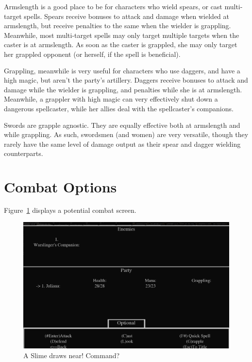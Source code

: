 \documentclass{report}
\begin{document}
\begin{itemize}
\begin{itemize}
Armslength is a good place to be for characters who wield spears, or cast 
multi-target spells. Spears receive bonuses to attack and damage when wielded at
armslength, but receive penalties to the same when the wielder is grappling. 
Meanwhile, most multi-target spells may only target multiple targets when the 
caster is at armslength. As soon as the caster is grappled, she may only target
her grappled opponent (or herself, if the spell is beneficial).

Grappling, meanwhile is very useful for characters who use daggers, and have a 
high magic, but aren't the party's artillery. Daggers receive bonuses to attack
and damage while the wielder is grappling, and penalties while she is at
armslength. Meanwhile, a grappler with high magic can very effectively shut down
a dangerous spellcaster, while her allies deal with the spellcaster's companions.

Swords are grapple agnostic. They are equally effective both at armslength and
while grappling. As such, swordsmen (and women) are very versatile, though they rarely have the 
same level of damage output as their spear and dagger wielding counterparts.

\section{Combat Options}

Figure~\ref{fig_combat} displays a potential combat screen.


\begin{figure}[h!]
    \includegraphics[width=\textwidth]{combat}
    \caption{A Slime draws near! Command?}
    \label{fig_combat}
\end{figure}


\end{itemize}
\end{itemize}
\end{document}
